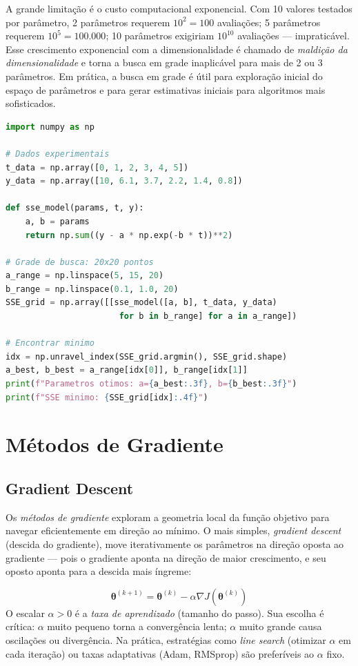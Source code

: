 A grande limitação é o custo computacional exponencial. Com 10 valores testados por
parâmetro, 2 parâmetros requerem $10^2 = 100$ avaliações; 5 parâmetros requerem
$10^5 = 100.000$; 10 parâmetros exigiriam $10^{10}$ avaliações --- impraticável.
Esse crescimento exponencial com a dimensionalidade é chamado de \emph{maldição da
dimensionalidade} e torna a busca em grade inaplicável para mais de 2 ou 3 parâmetros.
Em prática, a busca em grade é útil para exploração inicial do espaço de parâmetros e
para gerar estimativas iniciais para algoritmos mais sofisticados.

\begin{lstlisting}[language=Python, caption=Busca em grade 2D para modelo exponencial]
import numpy as np

# Dados experimentais
t_data = np.array([0, 1, 2, 3, 4, 5])
y_data = np.array([10, 6.1, 3.7, 2.2, 1.4, 0.8])

def sse_model(params, t, y):
    a, b = params
    return np.sum((y - a * np.exp(-b * t))**2)

# Grade de busca: 20x20 pontos
a_range = np.linspace(5, 15, 20)
b_range = np.linspace(0.1, 1.0, 20)
SSE_grid = np.array([[sse_model([a, b], t_data, y_data)
                       for b in b_range] for a in a_range])

# Encontrar minimo
idx = np.unravel_index(SSE_grid.argmin(), SSE_grid.shape)
a_best, b_best = a_range[idx[0]], b_range[idx[1]]
print(f"Parametros otimos: a={a_best:.3f}, b={b_best:.3f}")
print(f"SSE minimo: {SSE_grid[idx]:.4f}")
\end{lstlisting}

\section{Métodos de Gradiente}

\subsection{Gradient Descent}

Os \emph{métodos de gradiente} exploram a geometria local da função objetivo para navegar
eficientemente em direção ao mínimo. O mais simples, \emph{gradient descent} (descida do
gradiente), move iterativamente os parâmetros na direção oposta ao gradiente --- pois o
gradiente aponta na direção de maior crescimento, e seu oposto aponta para a descida mais
íngreme:

\begin{equation}
\boldsymbol{\theta}^{(k+1)} = \boldsymbol{\theta}^{(k)} - \alpha \nabla J(\boldsymbol{\theta}^{(k)})
\end{equation}
O escalar $\alpha > 0$ é a \emph{taxa de aprendizado} (tamanho do passo). Sua escolha é
crítica: $\alpha$ muito pequeno torna a convergência lenta; $\alpha$ muito grande causa
oscilações ou divergência. Na prática, estratégias como \emph{line search} (otimizar
$\alpha$ em cada iteração) ou taxas adaptativas (Adam, RMSprop) são preferíveis ao $\alpha$
fixo.

